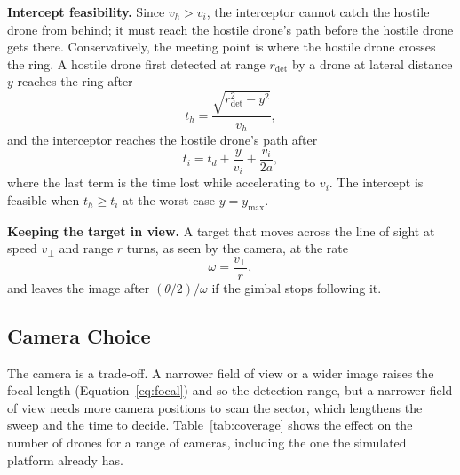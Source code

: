 \textbf{Intercept feasibility.} Since $v_h > v_i$, the interceptor cannot catch
the hostile drone from behind; it must reach the hostile drone's path before
the hostile drone gets there. Conservatively, the meeting point is where the
hostile drone crosses the ring. A hostile drone first detected at range
$r_{\mathrm{det}}$ by a drone at lateral distance $y$ reaches the ring after
\begin{equation}
  t_h = \frac{\sqrt{r_{\mathrm{det}}^2 - y^2}}{v_h},
  \label{eq:th}
\end{equation}
and the interceptor reaches the hostile drone's path after
\begin{equation}
  t_i = t_d + \frac{y}{v_i} + \frac{v_i}{2a},
  \label{eq:ti}
\end{equation}
where the last term is the time lost while accelerating to $v_i$. The
intercept is feasible when $t_h \geq t_i$ at the worst case $y = y_{\max}$.

\textbf{Keeping the target in view.} A target that moves across the line of
sight at speed $v_\perp$ and range $r$ turns, as seen by the camera, at the
rate
\begin{equation}
  \omega = \frac{v_\perp}{r},
  \label{eq:angrate}
\end{equation}
and leaves the image after $(\theta/2)/\omega$ if the gimbal stops following
it.

\subsection{Camera Choice}
\label{sec:camera-choice}

The camera is a trade-off. A narrower field of view or a wider image raises
the focal length (Equation~\eqref{eq:focal}) and so the detection range, but a
narrower field of view needs more camera positions to scan the sector, which
lengthens the sweep and the time to decide. Table~\ref{tab:coverage} shows the
effect on the number of drones for a range of cameras, including the one the
simulated platform already has.

